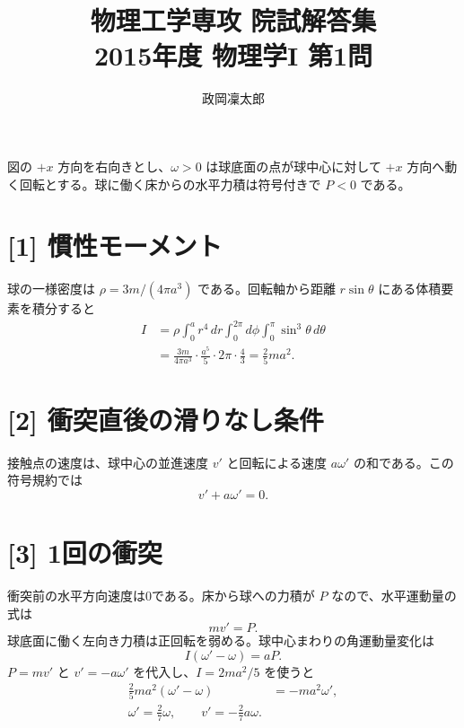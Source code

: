 \documentclass[11pt,a4paper]{article}
\title{物理工学専攻 院試解答集\\2015年度 物理学I 第1問}
\author{政岡凜太郎}
\date{}
\begin{document}
\maketitle

図の $+x$ 方向を右向きとし、$\omega>0$ は球底面の点が球中心に対して $+x$ 方向へ動く回転とする。球に働く床からの水平力積は符号付きで $P<0$ である。

\begin{center}
\end{center}

\section*{[1] 慣性モーメント}
球の一様密度は $\rho=3m/(4\pi a^3)$ である。回転軸から距離 $r\sin\theta$ にある体積要素を積分すると
\begin{align}
 I&=\rho\int_0^a r^4\,dr\int_0^{2\pi}d\phi\int_0^\pi\sin^3\theta\,d\theta\\
 &=\frac{3m}{4\pi a^3}\cdot\frac{a^5}{5}\cdot2\pi\cdot\frac43
 =\boxed{\frac25ma^2}.
\end{align}

\section*{[2] 衝突直後の滑りなし条件}
接触点の速度は、球中心の並進速度 $v'$ と回転による速度 $a\omega'$ の和である。この符号規約では
\begin{equation}
 \boxed{v'+a\omega'=0}.
\end{equation}

\section*{[3] 1回の衝突}
衝突前の水平方向速度は0である。床から球への力積が $P$ なので、水平運動量の式は
\begin{equation}
 mv'=P.
\end{equation}
球底面に働く左向き力積は正回転を弱める。球中心まわりの角運動量変化は
\begin{equation}
 I(\omega'-\omega)=aP.
\end{equation}
$P=mv'$ と $v'=-a\omega'$ を代入し、$I=2ma^2/5$ を使うと
\begin{align}
 \frac25ma^2(\omega'-\omega)&=-ma^2\omega',\\
 \boxed{\omega'=\frac27\omega},\qquad
 \boxed{v'=-\frac27a\omega}.
\end{align}
\end{document}
